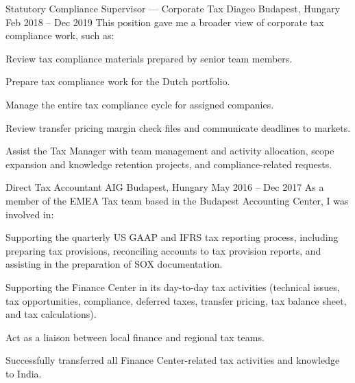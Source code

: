 \begin{cventries}

  \cventry
    {Statutory Compliance Supervisor — Corporate Tax} %
    {Diageo} %
    {Budapest, Hungary} %
    {Feb 2018 -- Dec 2019} %
    {This position gave me a broader view of corporate tax compliance work, such as:} %
    {
      \begin{cvitems} %
        \item {Review tax compliance materials prepared by senior team members.}
        \item {Prepare tax compliance work for the Dutch portfolio.}
        \item {Manage the entire tax compliance cycle for assigned companies.}
        \item {Review transfer pricing margin check files and communicate deadlines to markets.}
        \item {Assist the Tax Manager with team management and activity allocation, scope expansion and knowledge retention projects, and compliance-related requests.}
      \end{cvitems}
    }


  \cventry
    {Direct Tax Accountant} %
    {AIG} %
    {Budapest, Hungary} %
    {May 2016 -- Dec 2017} %
    {As a member of the EMEA Tax team based in the Budapest Accounting Center, I was involved in:} %
    {
      \begin{cvitems} %
        \item {Supporting the quarterly US GAAP and IFRS tax reporting process, including preparing tax provisions, reconciling accounts to tax provision reports, and assisting in the preparation of SOX documentation.}
        \item {Supporting the Finance Center in its day-to-day tax activities (technical issues, tax opportunities, compliance, deferred taxes, transfer pricing, tax balance sheet, and tax calculations).}
        \item {Act as a liaison between local finance and regional tax teams.}
        \item {Successfully transferred all Finance Center-related tax activities and knowledge to India.}
      \end{cvitems}
    }


\end{cventries}
